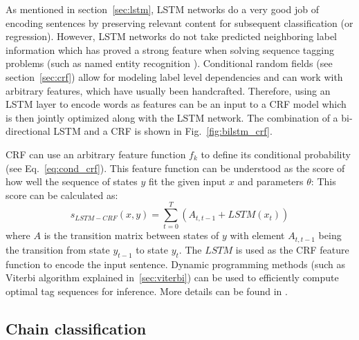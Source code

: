 As mentioned in section~\ref{sec:lstm}, LSTM networks do a very good job of
encoding sentences by preserving relevant content for subsequent classification
(or regression).  However, LSTM networks do not take predicted neighboring
label information which has proved a strong feature when solving sequence
tagging problems (such as named entity recognition \citep{nadeau2007survey}).
Conditional random fields (see section~\ref{sec:crf}) allow for modeling label
level dependencies and can work with arbitrary features, which have usually
been handcrafted.
Therefore, using an LSTM layer to encode words as features can be an input to a
CRF model which is then jointly optimized along with the LSTM network.  
The combination of a bi-directional LSTM and a CRF is shown in Fig.~\ref{fig:bilstm_crf}.

CRF can use an arbitrary feature function $f_k$
to define its conditional probability (see Eq.~\ref{eq:cond_crf}).
This feature function can 
be understood as the score of how well the sequence 
of states $y$ fit the given input $x$ and parameters $\theta$:
This score can be calculated as:
$$
s_{\mathit{LSTM-CRF}}(x, y) = \sum_{t=0}^{T} \left( A_{\mathit{t, t-1}} + \mathit{LSTM}(x_t) \right)
$$
where $A$ is the transition matrix between states of $y$ with element $A_{t,
t-1}$ being the transition from state $y_{t-1}$ to state $y_{t}$. The $LSTM$ is
used as the CRF feature function to encode the input sentence.  Dynamic
programming methods (such as Viterbi algorithm explained in~\ref{sec:viterbi})
can be used to efficiently compute optimal tag sequences for inference. More
details can be found in \citep{huang2015bidirectional}.

\subsection{Chain classification}
\label{sec:chain_classification}

